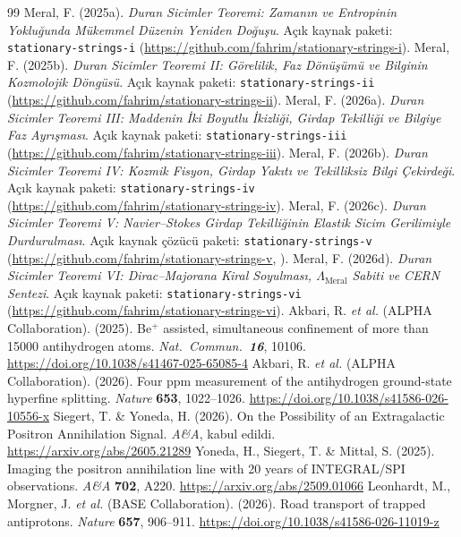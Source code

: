 \documentclass[12pt,a4paper]{article}
\begin{document}
\begin{thebibliography}{99}
     Meral, F. (2025a). \textit{Duran Sicimler Teoremi: Zamanın ve Entropinin Yokluğunda Mükemmel Düzenin Yeniden Doğuşu}. Açık kaynak paketi: \texttt{stationary-strings-i} (\url{https://github.com/fahrim/stationary-strings-i}).
     Meral, F. (2025b). \textit{Duran Sicimler Teoremi II: Görelilik, Faz Dönüşümü ve Bilginin Kozmolojik Döngüsü}. Açık kaynak paketi: \texttt{stationary-strings-ii} (\url{https://github.com/fahrim/stationary-strings-ii}).
     Meral, F. (2026a). \textit{Duran Sicimler Teoremi III: Maddenin İki Boyutlu İkizliği, Girdap Tekilliği ve Bilgiye Faz Ayrışması}. Açık kaynak paketi: \texttt{stationary-strings-iii} (\url{https://github.com/fahrim/stationary-strings-iii}).
     Meral, F. (2026b). \textit{Duran Sicimler Teoremi IV: Kozmik Fisyon, Girdap Yakıtı ve Tekilliksiz Bilgi Çekirdeği}. Açık kaynak paketi: \texttt{stationary-strings-iv} (\url{https://github.com/fahrim/stationary-strings-iv}).
     Meral, F. (2026c). \textit{Duran Sicimler Teoremi V: Navier--Stokes Girdap Tekilliğinin Elastik Sicim Gerilimiyle Durdurulması}. Açık kaynak çözücü paketi: \texttt{stationary-strings-v} (\url{https://github.com/fahrim/stationary-strings-v}, ).
     Meral, F. (2026d). \textit{Duran Sicimler Teoremi VI: Dirac--Majorana Kiral Soyulması, $\Lambda_{\mathrm{Meral}}$ Sabiti ve CERN Sentezi}. Açık kaynak paketi: \texttt{stationary-strings-vi} (\url{https://github.com/fahrim/stationary-strings-vi}).
     Akbari, R. \textit{et al.} (ALPHA Collaboration). (2025). Be$^+$ assisted, simultaneous confinement of more than 15000 antihydrogen atoms. \textit{Nat.\ Commun.\ \textbf{16}}, 10106. \url{https://doi.org/10.1038/s41467-025-65085-4}
     Akbari, R. \textit{et al.} (ALPHA Collaboration). (2026). Four ppm measurement of the antihydrogen ground-state hyperfine splitting. \textit{Nature} \textbf{653}, 1022--1026. \url{https://doi.org/10.1038/s41586-026-10556-x}
     Siegert, T. \& Yoneda, H. (2026). On the Possibility of an Extragalactic Positron Annihilation Signal. \textit{A\&A}, kabul edildi. \url{https://arxiv.org/abs/2605.21289}
     Yoneda, H., Siegert, T. \& Mittal, S. (2025). Imaging the positron annihilation line with 20 years of INTEGRAL/SPI observations. \textit{A\&A} \textbf{702}, A220. \url{https://arxiv.org/abs/2509.01066}
     Leonhardt, M., Morgner, J. \textit{et al.} (BASE Collaboration). (2026). Road transport of trapped antiprotons. \textit{Nature} \textbf{657}, 906--911. \url{https://doi.org/10.1038/s41586-026-11019-z}

\end{thebibliography}
\end{document}
